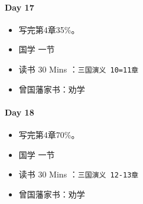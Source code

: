 \documentclass[UTF8,a4paper,8pt]{ctexart}
\begin{document}
 	 \paragraph{Day 17      \quad     }
	 	 \begin{itemize}[itemindent = 1em]
	 	 	\renewcommand\labelitemi{\makebox[0pt][l]{$\square$}\raisebox{.15ex}{\hspace{0.1em}$\checkmark$}}		
	 	 	
	 	 	\item    写完第4章35\%。
	 	 	
	 	 	
	 	 	\renewcommand\labelitemi{\makebox[0pt][l]{$\square$}\hspace{1em}}
	 	 	\item   国学  一节
	 	 	\item   读书  30 Mins	：\verb|三国演义 10=11章|
	 	 	\item   曾国藩家书：劝学
	 	 \end{itemize}
 	 \paragraph{Day 18      \quad     }
	 	 \begin{itemize}[itemindent = 1em]
	 	 	\renewcommand\labelitemi{\makebox[0pt][l]{$\square$}\raisebox{.15ex}{\hspace{0.1em}$\checkmark$}}		
	 	 	
	 	 	\item    写完第4章70\%。
	 	 	
	 	 	
	 	 	\renewcommand\labelitemi{\makebox[0pt][l]{$\square$}\hspace{1em}}
	 	 	\item   国学  一节
	 	 	\item   读书  30 Mins	：\verb|三国演义 12-13章|
	 	 	\item   曾国藩家书：劝学
	 	 \end{itemize}
	 	 
\end{document}
